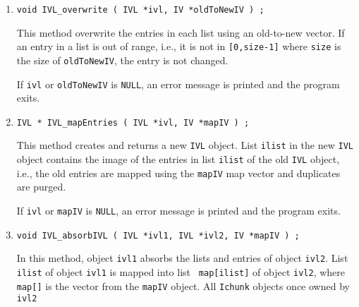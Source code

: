 \begin{enumerate}
These methods are used to find the natural compressed graph of a
matrix \cite{ash95-compressed-graphs}.
The returned {\tt int} vector or {\tt IV} object 
has size {\tt ivl->nlist}
and contains a map from the lists in {\tt ivl} to the lists in the
new {\tt IVL} object.
If {\tt nlist} is zero, {\tt NULL} is returned.
\par {}
As usual, if {\tt ivl} is {\tt NULL} or {\tt nlist < 0} then 
an error message is printed and the program exits.
\item
\begin{verbatim}
void IVL_overwrite ( IVL *ivl, IV *oldToNewIV ) ;
\end{verbatim}
This method overwrite the entries in each list using an old-to-new
vector.
If an entry in a list is out of range, i.e., 
it is not in {\tt [0,size-1]}
where {\tt size} is the size of {\tt oldToNewIV}, 
the entry is not changed.
\par {}
If {\tt ivl} or {\tt oldToNewIV} is {\tt NULL},
an error message is printed and the program exits.
\item
\begin{verbatim}
IVL * IVL_mapEntries ( IVL *ivl, IV *mapIV ) ;
\end{verbatim}
This method creates and returns a new {\tt IVL} object.
List {\tt ilist} in the new {\tt IVL} object contains the image of
the entries in list {\tt ilist} of the old {\tt IVL} object, i.e.,
the old entries are mapped using the {\tt mapIV} map vector and
duplicates are purged.
\par {}
If {\tt ivl} or {\tt mapIV} is {\tt NULL},
an error message is printed and the program exits.
\item
\begin{verbatim}
void IVL_absorbIVL ( IVL *ivl1, IVL *ivl2, IV *mapIV ) ;
\end{verbatim}
In this method, object {\tt ivl1} absorbs the lists and entries
of object {\tt ivl2}.
List {\tt ilist} of object {\tt ivl1} is mapped into list {\tt
map[ilist]} of object {\tt ivl2}, where {\tt map[]} is the vector
from the {\tt mapIV} object.
All {\tt Ichunk} objects once owned by {\tt ivl2}

\end{enumerate}
